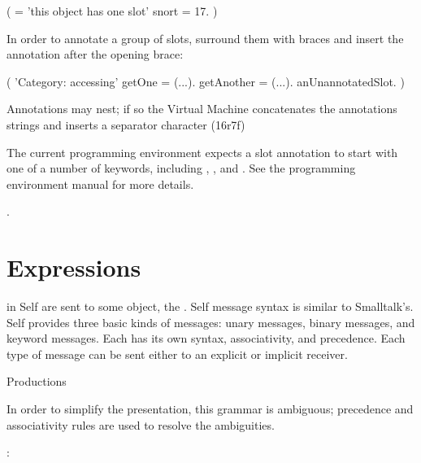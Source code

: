 \documentclass[letterpaper,10pt,english]{sphinxmanual}
\begin{document}
\begin{sphinxVerbatim}[commandchars=\\\{\}]
( \textbar{} \PYGZob{}\PYGZcb{} = ’this object has one slot’ snort = 17. \textbar{} ) \PYGZcb{}
\end{sphinxVerbatim}

In order to annotate a group of slots, surround them with braces and insert the annotation after the opening brace:

\begin{sphinxVerbatim}[commandchars=\\\{\}]
( \textbar{}
      \PYGZob{} ’Category: accessing’
            getOne = (...).
            getAnother = (...).
      \PYGZcb{}
      anUnannotatedSlot.
\textbar{} )
\end{sphinxVerbatim}

Annotations may nest; if so the Virtual Machine concatenates the annotations strings and inserts a separator character (16r7f) %
\begin{footnote}[7]\sphinxAtStartFootnote
The current programming environment expects a slot annotation to start with one of a number of keywords, including , , and . See the programming environment manual for more details.
%
\end{footnote}.
\newpage{}\label{\detokenize{langref:langref-expressions}}

\section{Expressions}
\label{\detokenize{langref:expressions}}\label{\detokenize{langref:pp-langref-expressions}}\label{\detokenize{langref:langref-expressions}}
 in Self are  sent to some object, the . Self message syntax is similar to Smalltalk’s. Self provides three basic kinds of messages: unary messages, binary messages, and keyword messages. Each has its own syntax, associativity, and precedence. Each type of message can be sent either to an explicit or implicit receiver.

Productions %
\begin{footnote}[8]\sphinxAtStartFootnote
In order to simplify the presentation, this grammar is ambiguous; precedence and associativity rules are used to resolve the ambiguities.
%
\end{footnote}:
\end{document}
